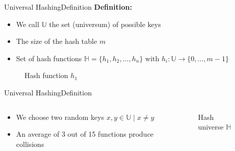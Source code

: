\begin{frame}{Universal Hashing}{Definition}
  \textbf{Definition:}
  \begin{itemize}
    \item
      We call $\mathbb{U}$ the set (universum) of possible keys
    \item
      The size of the hash table $m$
    \item
      Set of hash functions $\mathbb{H} = \{h_1, h_2,\dots, h_n\}$ with
      $h_i: \mathbb{U} \to \{0,\dots, m - 1\}$
  \end{itemize}%
  \begin{figure}[!b]%
    \begin{adjustbox}{height=0.35\linewidth}%
    \end{adjustbox}
    \vspace*{-1.0em}%
    \caption{Hash function $h_1$}%
    \label{fig:universal_hashing:hash_function_definition}
  \end{figure}
\end{frame}


\begin{frame}{Universal Hashing}{Definition}
  \begin{columns}
    \begin{column}{0.5\linewidth}
      \begin{itemize}
        \item
          We choose two random keys $x, y \in \mathbb{U} \mid x \neq 
          y$
        \item
          An average of 3 out of 15 functions produce collisions
      \end{itemize}
    \end{column}
    \begin{column}{0.5\linewidth}
      \begin{figure}[!t]%
        \begin{adjustbox}{width=\linewidth}
        \end{adjustbox}
        \caption{Hash universe $\mathbb{H}$}%
        \label{fig:universal_hashing:hash_universe}
      \end{figure}
    \end{column}
  \end{columns}
\end{frame}

